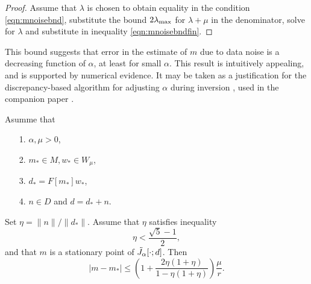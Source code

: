 \begin{proof} Assume that $\lambda$ is chosen to obtain equality in
  the condition \ref{eqn:mnoisebnd}, substitute the bound $2
  \lambda_{\rm max}$ for $\lambda + \mu$ in the denominator, solve for
  $\lambda$ and substitute in inequality \ref{eqn:mnoisebndfin}.
\end{proof}

 This bound suggests that error in the estimate
of $m$ due to data noise is a decreasing function of $\alpha$, at
least for small $\alpha$. This result is intuitively appealing, and is
supported by numerical evidence. It may be taken as a justification
for the discrepancy-based algorithm for adjusting $\alpha$ during
inversion \cite[]{FuSymes2017discrepancy}, used in the companion paper
\cite[]{SymesChenMinkoff:21}. 

\begin{theorem}
  \label{thm:mnoiseres}
  Asumme that
  \begin{itemize}
  \item[1. ] $\alpha, \mu> 0$,
  \item[2. ] $m_* \in M, w_* \in W_{\mu}$,
  \item[3. ] $d_* = F[m_*]w_*$,
  \item[4. ] $n \in D$ and $d = d_* + n$.
  \end{itemize}
  Set $\eta = \|n\|/\|d_*\|$. Assume that $\eta$ satisfies inequality \begin{equation}
  \label{eqn:mnoisecond}    
  \eta < \frac{\sqrt{5}-1}{2},
  \end{equation}
  and that $m$ is a stationary point of $\tilde{J}_{\alpha}[\cdot;d]$.
  Then
  \begin{equation}
    \label{eqn:mnoisesuff}
    |m-m_*| \le \left(1+\frac{2\eta(1+\eta)}{1-\eta(1+\eta)}\right)\frac{\mu}{r}.
  \end{equation}
\end{theorem}

